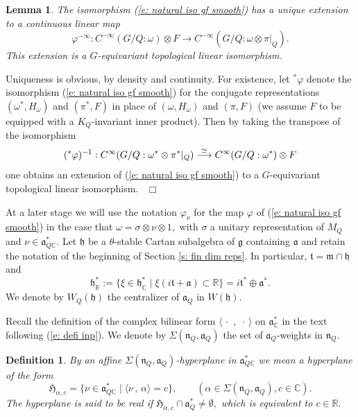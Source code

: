 \documentclass[12pt,a4paper]{article}
\newtheorem{Defi}[Thm]{Definition}
\newtheorem{Lemma}[Thm]{Lemma}
\newenvironment{defi}[0]{\begin{Defi}\noindent\rm}%
{\end{Defi}}
\newenvironment{lemma}[0]{\begin{Lemma}\noindent}%
{\end{Lemma}}
\def\proof{\par\noindent{\it Proof.}{\ }{\ }}
\def\qed{~\hfill\hbox{$\Box$}\medbreak}
\def\qquad{\quad\quad}
\def\msy#1{{\mathbb #1}}
\def\C{{\msy C}}
\def\R{{\msy R}}
\def\ga{\alpha}
\def\gf{\varphi}
\def\gs{\sigma}
\def\gS{\Sigma}
\def\got#1{\mathfrak #1}
\def\fa{{\got a}}
\def\fg{{\got g}}
\def\fh{{\got h}}
\def\fm{{\got m}}
\def\fn{{\got n}}
\def\ft{{\got t}}
\def\to{\rightarrow}
\def\inp#1#2{\langle#1\,,\,#2\rangle}
\def\iC{{\scriptscriptstyle \C}}
\numberwithin{Thm}{section}
\numberwithin{equation}{section}
\def\dotvar{\, \cdot\,}
\def\fadc{\fa_\C^*}
\numberwithin{equation}{section}
\def\ft{\mathfrak t}
\def\faQdc{\fa_{Q\iC}^*}
\def\fh{{\mathfrak h}}
\def\hypp{{\mathfrak H}}
\begin{document}
\begin{lemma}
The isomorphism (\ref{e: natural iso gf smooth}) has a unique  extension 
to a continuous linear map 
\begin{equation}
\label{e: def gf mininfty tensprod}
 \gf^{-\infty}: C^{-\infty}(G/Q: \omega) \otimes F \to C^{-\infty}(G/Q: \omega \otimes \pi|_Q).
\end{equation}
This extension is a $G$-equivariant topological linear isomorphism.
\end{lemma}

\proof
Uniqueness is obvious, by density and continuity.
For existence, let ${}^*\gf$ denote the isomorphism (\ref{e: natural iso gf smooth}) for the conjugate representations 
$(\omega^*, H_\omega)$ and $(\pi^*, F)$ 
in place of  $(\omega, H_\omega)$ and $(\pi, F)$ (we assume $F$ to be equipped with a $K_Q$-invariant inner product). Then by taking the transpose of the isomorphism 
$$ 
({}^*\gf)^{-1}: C^{\infty}(G/Q: \omega^* \otimes \pi^*|_Q) \;{\buildrel \simeq \over\longrightarrow}\; C^{\infty}(G/Q:  \omega^*) \otimes F
$$ 
one obtains an extension of (\ref{e: natural iso gf smooth}) to a $G$-equivariant topological  linear isomorphism. 
\qed 

 At a  later stage we will use the notation $\gf_\nu$ for the map $\gf$ of 
(\ref{e: natural iso gf smooth}) in the case that $\omega = \gs \otimes \nu \otimes 1,$
with $\gs$ a unitary representation of $M_Q$ and $\nu \in \faQdc.$ 
\medbreak
Let  $\fh$ be a $\theta$-stable Cartan subalgebra of $\fg$ containing $\fa$ 
and retain the notation of the beginning of Section \ref{s: fin dim reps}.
In particular, $\ft = \fm \cap \fh$ and 
$$
\fh^*_\R := \{\xi \in \fh^*_\iC\mid \xi(i\ft + \fa) \subset \R\} = i\ft^* \oplus \fa^*.
$$ 
We denote by $W_Q(\fh)$ the centralizer of $\fa_Q$ in 
$W(\fh).$ 

Recall the definition of the complex bilinear form $\inp{\dotvar}{\dotvar}$ on $\fadc$ 
in the text following (\ref{e: defi inp}).
We denote by $\gS(\fn_Q, \fa_Q)$ the set of $\fa_Q$-weights in $\fn_Q.$ 

\begin{defi}
\label{d: affine root hyperplane}
By an affine $\gS(\fn_Q, \fa_Q)$-hyperplane in $\faQdc$ we mean a hyperplane
of the form 
\begin{equation}
\label{e: defi H ga c}
\hypp_{\ga, c} = \{\nu \in \faQdc \mid \inp{\nu}{\ga} = c\}, \qquad (\ga \in \gS(\fn_Q, \fa_Q), c \in \C).
\end{equation} 
The hyperplane is said to be real if $\hypp_{\ga , c} \cap \fa_Q^*\not= \emptyset,$ 
which is equivalent to $c \in \R.$ 
\end{defi}
\end{document}

